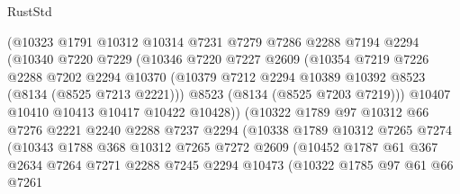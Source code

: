 \begin{lexlean}{RustStd}
\begin{coremodule}
                      (@10323
                        @1791
                        @10312
                        @10314
                        @7231
                        @7279
                        @7286
                        @2288
                        @7194
                        @2294
                        (@10340
                          @7220
                          @7229
                          (@10346
                            @7220
                            @7227
                            @2609
                            (@10354
                              @7219
                              @7226
                              @2288
                              @7202
                              @2294
                              @10370
                              (@10379 @7212 @2294 @10389 @10392 @8523 (@8134 (@8525 @7213 @2221)))
                              @8523
                              (@8134 (@8525 @7203 @7219)))
                            @10407
                            @10410
                            @10413
                            @10417
                            @10422
                            @10428))
                        (@10322
                          @1789
                          @97
                          @10312
                          @66
                          @7276
                          @2221
                          @2240
                          @2288
                          @7237
                          @2294
                          (@10338
                            @1789
                            @10312
                            @7265
                            @7274
                            (@10343
                              @1788
                              @368
                              @10312
                              @7265
                              @7272
                              @2609
                              (@10452
                                @1787
                                @61
                                @367
                                @2634
                                @7264
                                @7271
                                @2288
                                @7245
                                @2294
                                @10473
                                (@10322
                                  @1785
                                  @97
                                  @61
                                  @66
                                  @7261

\end{coremodule}
\end{lexlean}
